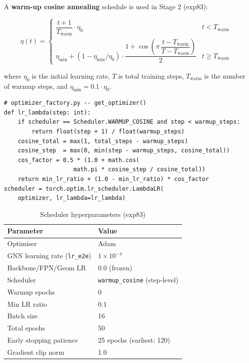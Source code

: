 \documentclass[11pt,a4paper]{article}
\begin{document}
A \textbf{warm-up cosine annealing} schedule is used in Stage 2 (exp83):

\[
\eta(t) =
\begin{cases}
\dfrac{t+1}{T_{\text{warm}}} \cdot \eta_0 & t < T_{\text{warm}} \\[6pt]
\eta_{\min} + \left(1 - \eta_{\min}/\eta_0\right)
  \cdot \dfrac{1 + \cos\!\left(\pi\,\dfrac{t - T_{\text{warm}}}{T - T_{\text{warm}}}\right)}{2}
& t \geq T_{\text{warm}}
\end{cases}
\]

where $\eta_0$ is the initial learning rate, $T$ is total training steps,
$T_{\text{warm}}$ is the number of warmup steps, and
$\eta_{\min} = 0.1 \cdot \eta_0$.

\begin{lstlisting}
# optimizer_factory.py -- get_optimizer()
def lr_lambda(step: int):
    if scheduler == Scheduler.WARMUP_COSINE and step < warmup_steps:
        return float(step + 1) / float(warmup_steps)
    cosine_total = max(1, total_steps - warmup_steps)
    cosine_step  = max(0, min(step - warmup_steps, cosine_total))
    cos_factor = 0.5 * (1.0 + math.cos(
                    math.pi * cosine_step / cosine_total))
    return min_lr_ratio + (1.0 - min_lr_ratio) * cos_factor
scheduler = torch.optim.lr_scheduler.LambdaLR(
    optimizer, lr_lambda=lr_lambda)
\end{lstlisting}

\begin{table}[H]
\centering
\caption{Scheduler hyperparameters (exp83)}
\begin{tabular}{ll}
\toprule
Parameter & Value \\
\midrule
Optimiser & Adam \\
GNN learning rate (\texttt{lr\_e2e}) & $1 \times 10^{-4}$ \\
Backbone/FPN/Geom LR & 0.0 (frozen) \\
Scheduler & \texttt{warmup\_cosine} (step-level) \\
Warmup epochs & 0 \\
Min LR ratio & 0.1 \\
Batch size & 16 \\
Total epochs & 50 \\
Early stopping patience & 25 epochs (earliest: 120) \\
Gradient clip norm & 1.0 \\
\bottomrule
\end{tabular}
\end{table}
\end{document}
